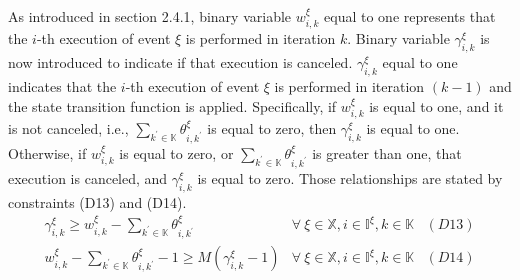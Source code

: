 \documentclass[]{interact}
\theoremstyle{plain}%
\theoremstyle{definition}
\theoremstyle{remark}
\begin{document}
As introduced in section 2.4.1, binary variable $w^{\xi}_{i,k}$ equal to one represents that the $i$-th execution of event ${\xi}$ is performed in iteration $k$. Binary variable $\gamma^{\xi}_{i,k}$ is now introduced to indicate if that execution is canceled. $\gamma^{\xi}_{i,k}$ equal to one indicates that the $i$-th execution of event $\xi$ is performed in iteration $(k-1)$ and the state transition function is applied. Specifically, if $w^{\xi}_{i,k}$ is equal to one, and it is not canceled, i.e., $\sum_{k^{'}\in \mathbb{K}}\theta^{\xi}_{i,k^{'}}$ is equal to zero, then $\gamma^{\xi}_{i,k}$ is equal to one. Otherwise, if $w^{\xi}_{i,k}$ is equal to zero, or $\sum_{k^{'}\in \mathbb{K}}\theta^{\xi}_{i,k^{'}}$ is greater than one, that execution is canceled, and $\gamma^{\xi}_{i,k}$ is equal to zero. Those relationships are stated by constraints (D13) and (D14). 
\begin{eqnarray}
\gamma^{\xi}_{i,k} \ge w^{\xi}_{i,k} - \sum_{k^{'}\in \mathbb{K}}\theta^{\xi}_{i,k^{'}}&\forall\ \xi\in \mathbb{X},i\in \mathbb{I}^{\xi},k\in \mathbb{K}&(D13)\nonumber\\
w^{\xi}_{i,k} - \sum_{k^{'}\in \mathbb{K}}\theta^{\xi}_{i,k^{'}} -1 \ge M(\gamma^{\xi}_{i,k}-1) &\forall\ \xi\in \mathbb{X},i\in \mathbb{I}^{\xi},k\in \mathbb{K}&(D14)\nonumber
\end{eqnarray}
\end{document}

